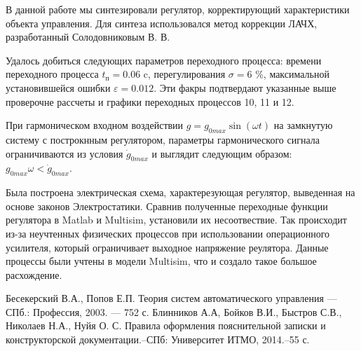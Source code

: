 \documentclass[russian, utf8]{eskdtext}
\begin{document}
В данной работе мы синтезировали регулятор, корректирующий характеристики объекта управления. Для синтеза использовался метод коррекции ЛАЧХ, разработанный Солодовниковым В. В. \par
Удалось добиться следующих параметров переходного процесса: времени переходного процесса $t_\text{п} = 0.06$ c, перегулирования $\sigma = 6$ \%, максимальной установившейся ошибки $\varepsilon = 0.012$. Эти факры подтвердают указанные выше проверочне рассчеты и графики переходных процессов 10, 11 и 12. \par
При гармоническом входном воздействии $g = g_{0max}\sin{(\omega t)}$ на замкнутую систему с построкнным регулятором, параметры гармонического сигнала ограничиваются из условия $\dot{g}_{0max}$ и выглядит следующим образом: $g_{0max} \omega < \dot{g}_{0max}$. \par
Была построена электрическая схема, характерезующая регулятор, выведенная на основе законов Электростатики. Сравнив полученные переходные функции регулятора в Matlab и Multisim, установили их несоотвествие. Так происходит из-за неучтенных физических процессов при использовании операционного усилителя, который ограничивает выходное напряжение реулятора. Данные процессы были учтены в модели Multisim, что и создало такое большое расхождение.

\newpage
%
\renewcommand\refname{Список использованных источников} %

\begin{thebibliography}{}
      Бесекерский В.А., Попов Е.П. Теория систем автоматического управления — СПб.: Профессия, 2003. — 752 с.
      Блинников А.А, Бойков В.И., Быстров С.В., Николаев Н.А., Нуйя О. С. Правила оформления пояснительной записки и конструкторской документации.–СПб: Университет ИТМО, 2014.–55 с.
\end{thebibliography}
\end{document}
